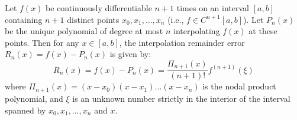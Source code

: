 \begin{theorembox}
Let $f(x)$ be continuously differentiable $n+1$ times on an interval $[a, b]$ containing $n+1$ distinct points $x_0, x_1, \dots, x_n$ (i.e., $f \in C^{n+1}[a, b]$). Let $P_n(x)$ be the unique polynomial of degree at most $n$ interpolating $f(x)$ at these points.
Then for any $x \in [a, b]$, the interpolation remainder error $R_n(x) = f(x) - P_n(x)$ is given by:
\begin{equation}
    \boxed{R_n(x) = f(x) - P_n(x) = \frac{\Pi_{n+1}(x)}{(n+1)!} f^{(n+1)}(\xi)}
\end{equation}
where $\Pi_{n+1}(x) = (x - x_0)(x - x_1)\dots(x - x_n)$ is the nodal product polynomial, and $\xi$ is an unknown number strictly in the interior of the interval spanned by $x_0, x_1, \dots, x_n$ and $x$.
\end{theorembox}

